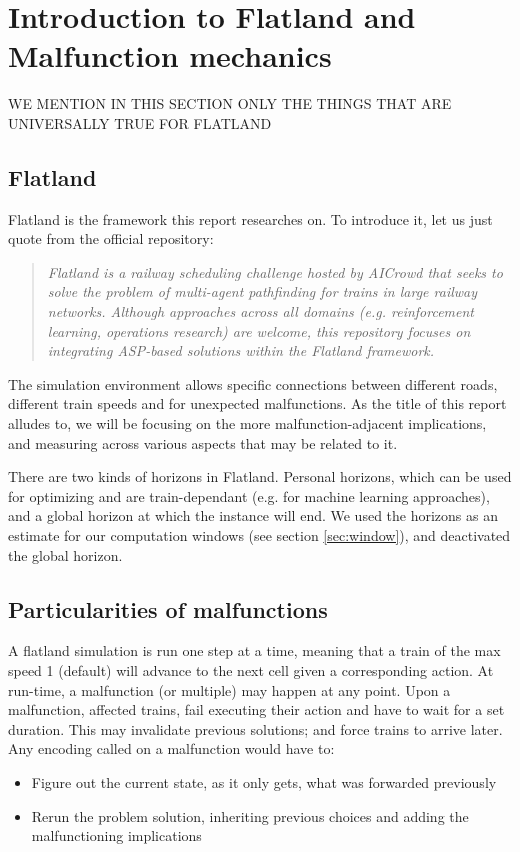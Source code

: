 \section{Introduction to Flatland and Malfunction mechanics}
\color{red} WE MENTION IN THIS SECTION ONLY THE THINGS THAT ARE UNIVERSALLY TRUE FOR FLATLAND \color{black}
\subsection{Flatland}
Flatland\cite{flatland} is the framework this report researches on. To introduce it, let us just quote from the official repository:
\begin{quote}
\emph{	Flatland is a railway scheduling challenge hosted by AICrowd that seeks to solve the problem of multi-agent pathfinding for trains in large railway networks. Although approaches across all domains (e.g. reinforcement learning, operations research) are welcome, this repository focuses on integrating ASP-based solutions within the Flatland framework.}
\end{quote}

The simulation environment allows specific connections between different roads, different train speeds and for unexpected malfunctions. As the title of this report alludes to, we will be focusing on the more malfunction-adjacent implications, and measuring across various aspects that may be related to it.

There are two kinds of horizons in Flatland. Personal horizons, which can be used for optimizing and are train-dependant (e.g. for machine learning approaches), and a global horizon at which the instance will end. We used the horizons as an estimate for our computation windows (see section \ref{sec:window}), and deactivated the global horizon.

\subsection{Particularities of malfunctions}
A flatland simulation is run one step at a time, meaning that a train of the max speed 1 (default) will advance to the next cell given a corresponding action. At run-time, a malfunction (or multiple) may happen at any point. Upon a malfunction, affected trains, fail executing their action and have to wait for a set duration. This may invalidate previous solutions; and force trains to arrive later.
Any encoding called on a malfunction would have to:
\begin{itemize}
	\item Figure out the current state, as it only gets, what was forwarded previously
	\item Rerun the problem solution, inheriting previous choices and adding the malfunctioning implications
\end{itemize}

